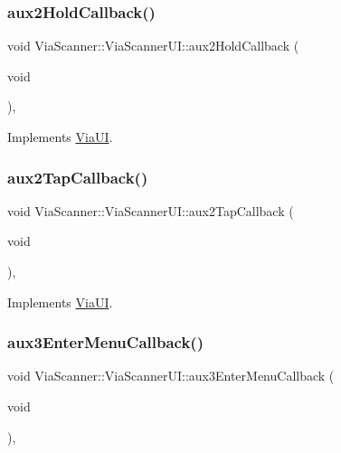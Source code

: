 \subsubsection{\texorpdfstring{aux2\+Hold\+Callback()}{aux2HoldCallback()}}
{\footnotesize\ttfamily void Via\+Scanner\+::\+Via\+Scanner\+U\+I\+::aux2\+Hold\+Callback (\begin{DoxyParamCaption}\item[{void}]{ }\end{DoxyParamCaption})\hspace{0.3cm}{\ttfamily [override]}, {\ttfamily [virtual]}}



Implements \mbox{\hyperlink{class_via_u_i_a42545b69c2bbbb036f633140fd8007d6}{Via\+UI}}.

\mbox{\label{class_via_scanner_1_1_via_scanner_u_i_a7d3aad2399479925618df242bc5b1f42}} 
\subsubsection{\texorpdfstring{aux2\+Tap\+Callback()}{aux2TapCallback()}}
{\footnotesize\ttfamily void Via\+Scanner\+::\+Via\+Scanner\+U\+I\+::aux2\+Tap\+Callback (\begin{DoxyParamCaption}\item[{void}]{ }\end{DoxyParamCaption})\hspace{0.3cm}{\ttfamily [override]}, {\ttfamily [virtual]}}



Implements \mbox{\hyperlink{class_via_u_i_ae5e009dc22002f62e6bff8dd76d2f745}{Via\+UI}}.

\mbox{\label{class_via_scanner_1_1_via_scanner_u_i_ade6dc0e93911fe51731bffa65990599a}} 
\subsubsection{\texorpdfstring{aux3\+Enter\+Menu\+Callback()}{aux3EnterMenuCallback()}}
{\footnotesize\ttfamily void Via\+Scanner\+::\+Via\+Scanner\+U\+I\+::aux3\+Enter\+Menu\+Callback (\begin{DoxyParamCaption}\item[{void}]{ }\end{DoxyParamCaption})\hspace{0.3cm}{\ttfamily [override]}, {\ttfamily [virtual]}}



